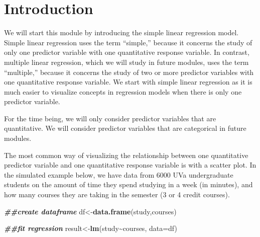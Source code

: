 \documentclass[
]{book}
\newenvironment{Shaded}{\begin{snugshade}}{\end{snugshade}}
\newcommand{\AttributeTok}[1]{\textcolor[rgb]{0.13,0.29,0.53}{#1}}
\newcommand{\DocumentationTok}[1]{\textcolor[rgb]{0.56,0.35,0.01}{\textbf{\textit{#1}}}}
\newcommand{\FunctionTok}[1]{\textcolor[rgb]{0.13,0.29,0.53}{\textbf{#1}}}
\newcommand{\NormalTok}[1]{#1}
\newcommand{\OtherTok}[1]{\textcolor[rgb]{0.56,0.35,0.01}{#1}}
\newcommand{\SpecialCharTok}[1]{\textcolor[rgb]{0.81,0.36,0.00}{\textbf{#1}}}
\newcommand{\StringTok}[1]{\textcolor[rgb]{0.31,0.60,0.02}{#1}}
\begin{document}
\hypertarget{introduction-2}{%
\section{Introduction}\label{introduction-2}}

We will start this module by introducing the simple linear regression model. Simple linear regression uses the term ``simple,'' because it concerns the study of only one predictor variable with one quantitative response variable. In contrast, multiple linear regression, which we will study in future modules, uses the term ``multiple,'' because it concerns the study of two or more predictor variables with one quantitative response variable. We start with simple linear regression as it is much easier to visualize concepts in regression models when there is only one predictor variable.

For the time being, we will only consider predictor variables that are quantitative. We will consider predictor variables that are categorical in future modules.

The most common way of visualizing the relationship between one quantitative predictor variable and one quantitative response variable is with a scatter plot. In the simulated example below, we have data from 6000 UVa undergraduate students on the amount of time they spend studying in a week (in minutes), and how many courses they are taking in the semester (3 or 4 credit courses).

\begin{Shaded}
\begin{Highlighting}[]
\DocumentationTok{\#\#create dataframe}
\NormalTok{df}\OtherTok{\textless{}{-}}\FunctionTok{data.frame}\NormalTok{(study,courses)}

\DocumentationTok{\#\#fit regression}
\NormalTok{result}\OtherTok{\textless{}{-}}\FunctionTok{lm}\NormalTok{(study}\SpecialCharTok{\textasciitilde{}}\NormalTok{courses, }\AttributeTok{data=}\NormalTok{df)}
\end{Highlighting}
\end{Shaded}

\begin{Shaded}
\end{Shaded}
\end{document}

